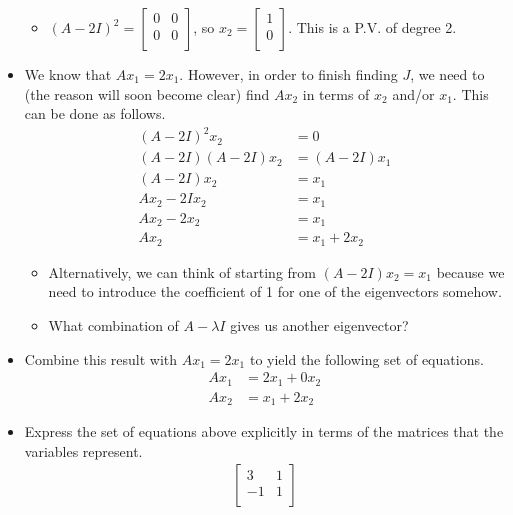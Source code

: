 \documentclass{article}
\begin{document}
\begin{itemize}
\begin{itemize}
        \item $
            (A-2I)^2 =
            \begin{bmatrix}
                0 & 0\\
                0 & 0\\
            \end{bmatrix}
        $, so $
            x_2=
            \begin{bmatrix}
                1\\
                0\\
            \end{bmatrix}
        $. This is a P.V. of degree 2.
    \end{itemize}
    \item We know that $Ax_1=2x_1$. However, in order to finish finding $J$, we need to (the reason will soon become clear) find $Ax_2$ in terms of $x_2$ and/or $x_1$. This can be done as follows.
    \begin{align*}
        (A-2I)^2x_2 &= 0\\
        (A-2I)(A-2I)x_2 &= (A-2I)x_1\\
        (A-2I)x_2 &= x_1\\
        Ax_2-2Ix_2 &= x_1\\
        Ax_2-2x_2 &= x_1\\
        Ax_2 &= x_1+2x_2
    \end{align*}
    \begin{itemize}
        \item Alternatively, we can think of starting from $(A-2I)x_2=x_1$ because we need to introduce the coefficient of 1 for one of the eigenvectors somehow.
        \item What combination of $A-\lambda I$ gives us another eigenvector?
    \end{itemize}
    \item Combine this result with $Ax_1=2x_1$ to yield the following set of equations.
    \begin{align*}
        Ax_1 &= 2x_1+0x_2\\
        Ax_2 &= x_1+2x_2
    \end{align*}
    \item Express the set of equations above explicitly in terms of the matrices that the variables represent.
    \begin{align*}
        \begin{bmatrix}
            3 & 1\\
            -1 & 1\\

\end{bmatrix}
\end{align*}
\end{itemize}
\end{document}
